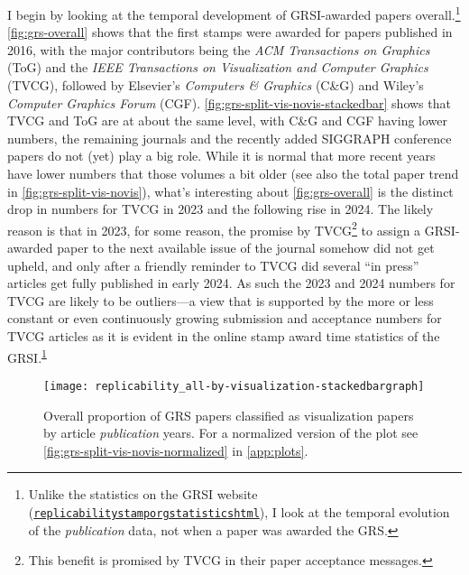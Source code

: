 \documentclass[conference,svgnames]{vgtc}                     %
\begin{document}
I begin by looking at the temporal development of GRSI-awarded papers overall.\footnote{\label{foot:grsi-statistics}Unlike the statistics on the GRSI website (\href{https://www.replicabilitystamp.org/statistics.html}{\texttt{replicabilitystamporg\discretionary{/}{}{/}statisticshtml}}), I look at the temporal evolution of the \emph{publication} data, not when a paper was awarded the GRS.} \autoref{fig:grs-overall} shows that the first stamps were awarded for papers published in 2016, with the major contributors being the \emph{ACM Transactions on Graphics} (ToG) and the \emph{IEEE Transactions on Visualization and Computer Graphics} (TVCG), followed by Elsevier's \emph{Computers \& Graphics} (C\&G) and Wiley's \emph{Computer Graphics Forum} (CGF). \autoref{fig:grs-split-vis-novis-stackedbar} shows that TVCG and ToG are at about the same level, with C\&G and CGF having lower numbers, the remaining journals and the recently added SIGGRAPH conference papers do not (yet) play a big role. While it is normal that more recent years have lower numbers that those volumes a bit older (see also the total paper trend in \autoref{fig:grs-split-vis-novis}), what's interesting about \autoref{fig:grs-overall} is the distinct drop in numbers for TVCG in 2023 and the following rise in 2024. The likely reason is that in 2023, for some reason, the promise by TVCG\footnote{\label{foot:tvcg-fast-track}This benefit is promised by TVCG in their paper acceptance messages.} to assign a GRSI-awarded paper to the next available issue of the journal somehow did not get upheld, and only after a friendly reminder to TVCG did several ``in press'' articles get fully published in early 2024. As such the 2023 and 2024 numbers for TVCG are likely to be outliers---a view that is supported by the more or less constant or even continuously growing submission and acceptance numbers for TVCG articles as it is evident in the online stamp award time statistics of the GRSI.\textsuperscript{\ref{foot:grsi-statistics}}

\begin{figure}
	\centering
	\texttt{[image: replicability\_all-by-visualization-stackedbargraph]}
	\caption{Overall proportion of GRS papers classified as visualization papers by article \emph{publication} years. For a normalized version of the plot see \autoref{fig:grs-split-vis-novis-normalized} in \autoref{app:plots}.}
	\label{fig:grs-split-vis-novis}
\end{figure}
\end{document}
